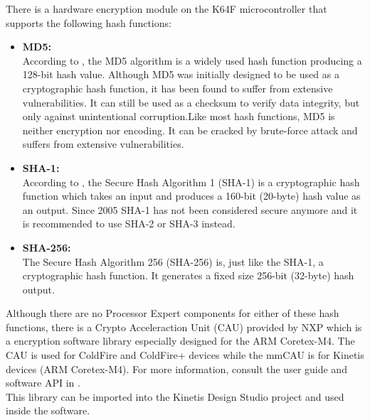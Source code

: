 There is a hardware encryption module on the K64F microcontroller that supports the following hash functions: \begin{itemize}
    \item \textbf{MD5:}\\
    According to \cite{MD5_Wikipedia}, the MD5 algorithm is a widely used hash function producing a 128-bit hash value. Although MD5 was initially designed to be used as a cryptographic hash function, it has been found to suffer from extensive vulnerabilities. It can still be used as a checksum to verify data integrity, but only against unintentional corruption.Like most hash functions, MD5 is neither encryption nor encoding. It can be cracked by brute-force attack and suffers from extensive vulnerabilities.
    \item \textbf{SHA-1:}\\
    According to \cite{SHA1_Wikipedia}, the Secure Hash Algorithm 1 (SHA-1) is a cryptographic hash function which takes an input and produces a 160-bit (20-byte) hash value as an output. Since 2005 SHA-1 has not been considered secure anymore and it is recommended to use SHA-2 or SHA-3 instead.
    \item \textbf{SHA-256:}\\
    The Secure Hash Algorithm 256 (SHA-256) is, just like the SHA-1, a cryptographic hash function. It generates a fixed size 256-bit (32-byte) hash output.
\end{itemize}
%
Although there are no Processor Expert components for either of these hash functions, there is a Crypto Acceleraction Unit (CAU) provided by NXP which is a encryption software library especially designed for the ARM Coretex-M4. The CAU is used for ColdFire and ColdFire+ devices while the mmCAU is for Kinetis devices (ARM Coretex-M4). For more information, consult the user guide and software API in \cite{CAU_UserGuide}.\\
This library can be imported into the Kinetis Design Studio project and used inside the software.
%
%
%
%
%
%
%
